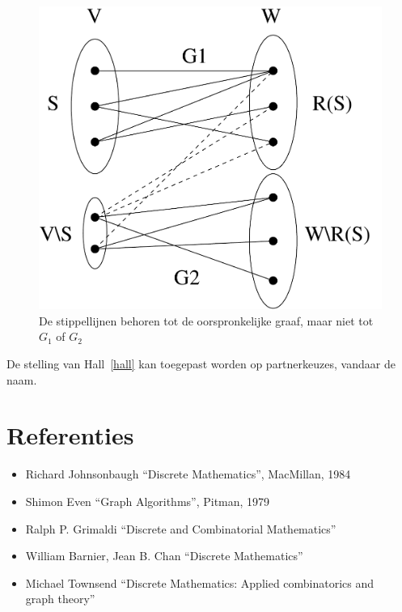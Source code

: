 \begin{figure}[h]
\begin{center}
\includegraphics[height=0.4\textheight,keepaspectratio]{hall}
\caption{De stippellijnen behoren tot de oorspronkelijke graaf, maar
niet tot $G_1$ of $G_2$}\label{hallfig}
\end{center}
\end{figure}


De stelling van Hall~\ref{hall} kan toegepast worden op partnerkeuzes,
vandaar de naam.







\newpage

\section{Referenties}

\begin{itemize}
\item
Richard Johnsonbaugh ``Discrete Mathematics'', MacMillan, 1984
\item
Shimon Even ``Graph Algorithms'', Pitman, 1979
\item
Ralph P. Grimaldi ``Discrete and Combinatorial Mathematics''
\item
William Barnier, Jean B. Chan ``Discrete Mathematics''
\item
Michael Townsend ``Discrete Mathematics: Applied combinatorics and \\
graph theory''
\end{itemize}


